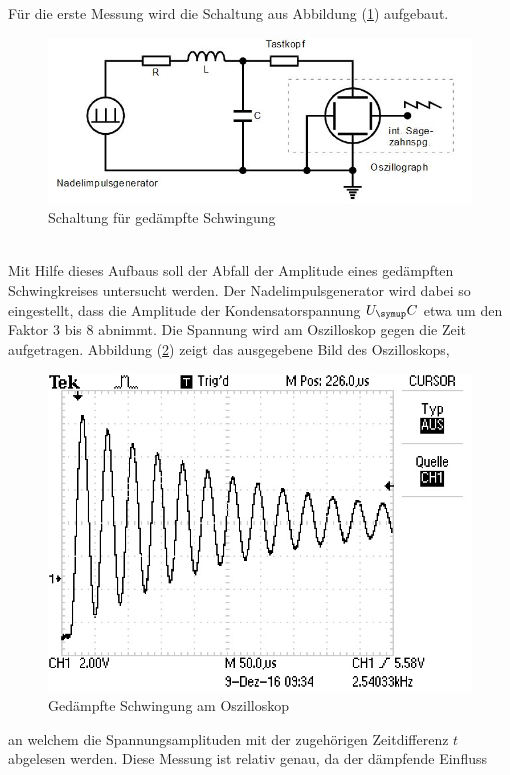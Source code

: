 Für die erste Messung wird die Schaltung aus Abbildung (\ref{fig:schlt1})
aufgebaut.
\begin{figure}[h]
  \centering
  \includegraphics[width=\textwidth]{Bilder/dmpfschalt.JPG}
  \caption{Schaltung für gedämpfte Schwingung}
  \label{fig:schlt1}
\end{figure} \\
Mit Hilfe dieses Aufbaus soll der Abfall der Amplitude eines gedämpften
Schwingkreises untersucht werden. Der Nadelimpulsgenerator wird dabei so
eingestellt, dass die Amplitude der Kondensatorspannung $U_\su{C}$ etwa um
den Faktor 3 bis 8 abnimmt. Die Spannung wird am Oszilloskop gegen die Zeit
aufgetragen.
Abbildung (\ref{fig:dämpfung}) zeigt das ausgegebene Bild des Oszilloskops,
\begin{figure} %
  \centering
  \includegraphics{Bilder/Dmpfung.JPG}
  \caption{Gedämpfte Schwingung am Oszilloskop}
  \label{fig:dämpfung}
\end{figure}
an welchem die Spannungsamplituden mit der zugehörigen Zeitdifferenz $t$
abgelesen werden. Diese Messung ist relativ genau, da der dämpfende Einfluss
